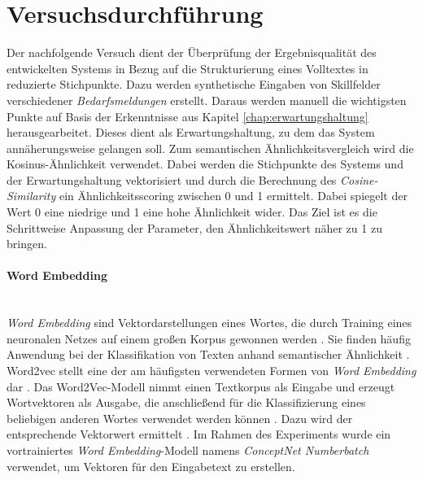 \section{Versuchsdurchführung}
Der nachfolgende Versuch dient der Überprüfung der Ergebnisqualität des entwickelten Systems in Bezug auf die Strukturierung eines Volltextes in reduzierte Stichpunkte. Dazu werden synthetische Eingaben von Skillfelder verschiedener \emph{Bedarfsmeldungen} erstellt. Daraus werden manuell die wichtigsten Punkte auf Basis der Erkenntnisse aus Kapitel \ref{chap:erwartungshaltung} herausgearbeitet. Dieses dient als Erwartungshaltung, zu dem das System annäherungsweise gelangen soll. Zum semantischen Ähnlichkeitsvergleich wird die Kosinus-Ähnlichkeit verwendet. Dabei werden die Stichpunkte des Systems und der Erwartungshaltung vektorisiert und durch die Berechnung des \emph{Cosine-Similarity} ein Ähnlichkeitsscoring zwischen 0 und 1 ermittelt. Dabei spiegelt der Wert 0 eine niedrige und 1 eine hohe Ähnlichkeit wider. Das Ziel ist es die Schrittweise Anpassung der Parameter, den Ähnlichkeitswert näher zu 1 zu bringen. 
\paragraph{Word Embedding}\mbox{}\\
\emph{Word Embedding} sind Vektordarstellungen eines Wortes, die durch Training eines neuronalen Netzes auf einem großen Korpus gewonnen werden \cite{sitikhu2019comparison}. Sie finden häufig Anwendung bei der Klassifikation von Texten anhand semantischer Ähnlichkeit \cite{sitikhu2019comparison}. Word2vec stellt eine der am häufigsten verwendeten Formen von \emph{Word Embedding} dar \cite{sitikhu2019comparison}. Das Word2Vec-Modell nimmt einen Textkorpus als Eingabe und erzeugt Wortvektoren als Ausgabe, die anschließend für die Klassifizierung eines beliebigen anderen Wortes verwendet werden können \cite{sitikhu2019comparison}. Dazu wird der entsprechende Vektorwert ermittelt \cite{sitikhu2019comparison}. Im Rahmen des Experiments wurde ein vortrainiertes \emph{Word Embedding}-Modell namens \emph{ConceptNet Numberbatch} \cite{speer2017conceptnet} verwendet, um Vektoren für den Eingabetext zu erstellen.
